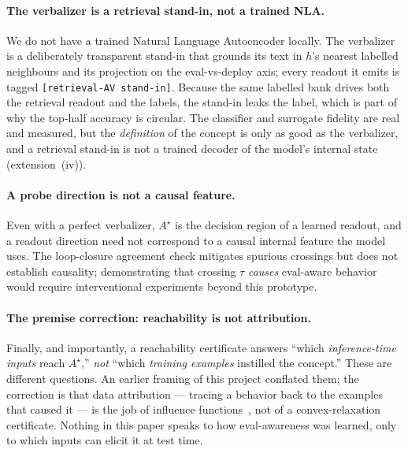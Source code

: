 \paragraph{The verbalizer is a retrieval stand-in, not a trained NLA.} We do not have
a trained Natural Language Autoencoder locally. The verbalizer is a deliberately
transparent stand-in that grounds its text in $h$'s nearest labelled neighbours and
its projection on the eval-vs-deploy axis; every readout it emits is tagged
\texttt{[retrieval-AV stand-in]}. Because the same labelled bank drives both the
retrieval readout and the labels, the stand-in leaks the label, which is part of why
the top-half accuracy is circular. The classifier and surrogate fidelity are real and
measured, but the \emph{definition} of the concept is only as good as the verbalizer,
and a retrieval stand-in is not a trained decoder of the model's internal state
(extension~(iv)).

\paragraph{A probe direction is not a causal feature.} Even with a perfect
verbalizer, $A^\star$ is the decision region of a learned readout, and a readout
direction need not correspond to a causal internal feature the model uses. The
loop-closure agreement check mitigates spurious crossings but does not establish
causality; demonstrating that crossing $\tau$ \emph{causes} eval-aware behavior would
require interventional experiments beyond this prototype.

\paragraph{The premise correction: reachability is not attribution.} Finally, and
importantly, a reachability certificate answers ``which \emph{inference-time inputs}
reach $A^\star$,'' \emph{not} ``which \emph{training examples} instilled the concept.''
These are different questions. An earlier framing of this project conflated them; the
correction is that data attribution --- tracing a behavior back to the examples that
caused it --- is the job of influence functions~\cite{koh2017influence,
grosse2023influence}, not of a convex-relaxation certificate. Nothing in this paper
speaks to how eval-awareness was learned, only to which inputs can elicit it at test
time.

